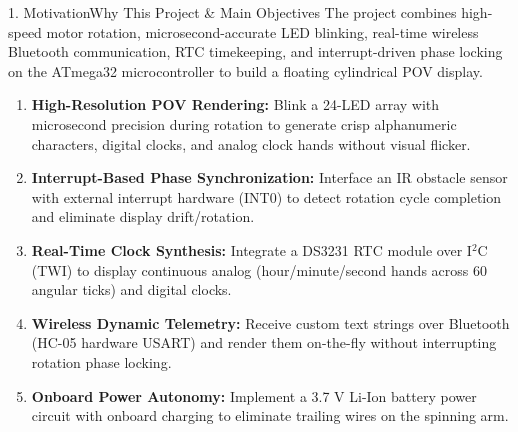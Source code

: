 \documentclass[aspectratio=169, 10pt]{beamer}
\begin{document}
\begin{frame}{1. Motivation}{Why This Project \& Main Objectives}
    \footnotesize The project combines high-speed motor rotation, microsecond-accurate LED blinking, real-time wireless Bluetooth communication, RTC timekeeping, and interrupt-driven phase locking on the ATmega32 microcontroller to build a floating cylindrical POV display.
    \vspace{0.05cm}
    \begin{enumerate}
        \footnotesize
        \item \textbf{High-Resolution POV Rendering:} Blink a 24-LED array with microsecond precision during rotation to generate crisp alphanumeric characters, digital clocks, and analog clock hands without visual flicker.
        \item \textbf{Interrupt-Based Phase Synchronization:} Interface an IR obstacle sensor with external interrupt hardware (INT0) to detect rotation cycle completion and eliminate display drift/rotation.
        \item \textbf{Real-Time Clock Synthesis:} Integrate a DS3231 RTC module over I$^2$C (TWI) to display continuous analog (hour/minute/second hands across 60 angular ticks) and digital clocks.
        \item \textbf{Wireless Dynamic Telemetry:} Receive custom text strings over Bluetooth (HC-05 hardware USART) and render them on-the-fly without interrupting rotation phase locking.
        \item \textbf{Onboard Power Autonomy:} Implement a 3.7 V Li-Ion battery power circuit with onboard charging to eliminate trailing wires on the spinning arm.
    \end{enumerate}
\end{frame}
\end{document}
